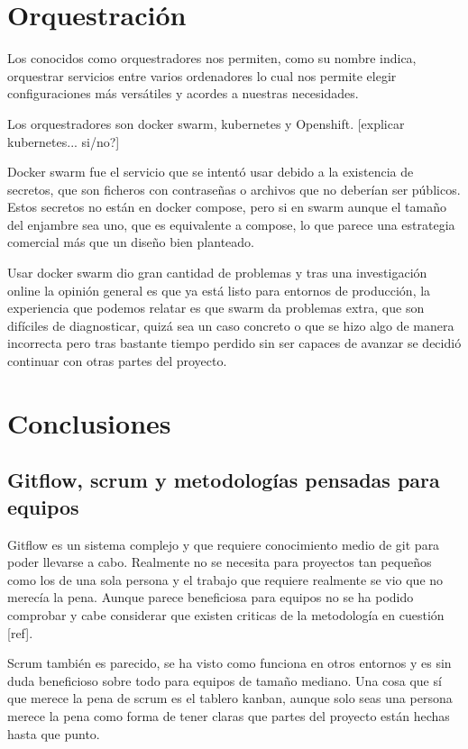 \section{Orquestración}

Los conocidos como orquestradores nos permiten, como su nombre indica, orquestrar servicios entre varios ordenadores lo cual nos permite elegir configuraciones más versátiles y acordes a nuestras necesidades. 

Los orquestradores son docker swarm, kubernetes y Openshift. [explicar kubernetes... si/no?]

Docker swarm fue el servicio que se intentó usar debido a la existencia de secretos, que son ficheros con contraseñas o archivos que no deberían ser públicos. Estos secretos no están en docker compose, pero si en swarm aunque el tamaño del enjambre sea uno, que es equivalente a compose, lo que parece una estrategia comercial más que un diseño bien planteado.

Usar docker swarm dio gran cantidad de problemas y tras una investigación online la opinión general es que ya está listo para entornos de producción, la experiencia que podemos relatar es que swarm da problemas extra, que son difíciles de diagnosticar, quizá sea un caso concreto o que se hizo algo de manera incorrecta pero tras bastante tiempo perdido sin ser capaces de avanzar se decidió continuar con otras partes del proyecto.


\section{Conclusiones}

\subsection{Gitflow, scrum y metodologías pensadas para equipos}

Gitflow es un sistema complejo y que requiere conocimiento medio de git para poder llevarse a cabo. Realmente no se necesita para proyectos tan pequeños como los de una sola persona y el trabajo que requiere realmente se vio que no merecía la pena. Aunque parece beneficiosa para equipos no se ha podido comprobar y cabe considerar que existen criticas de la metodología en cuestión [ref].

Scrum también es parecido, se ha visto como funciona en otros entornos y es sin duda beneficioso sobre todo para equipos de tamaño mediano. Una cosa que sí que merece la pena de scrum es el tablero kanban, aunque solo seas una persona merece la pena como forma de tener claras que partes del proyecto están hechas hasta que punto.

